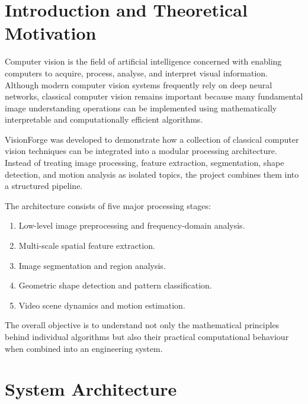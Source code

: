 \documentclass[11pt,a4paper]{article}
\begin{document}

\section{Introduction and Theoretical Motivation}

Computer vision is the field of artificial intelligence concerned with enabling computers to acquire, process, analyse, and interpret visual information. Although modern computer vision systems frequently rely on deep neural networks, classical computer vision remains important because many fundamental image understanding operations can be implemented using mathematically interpretable and computationally efficient algorithms.

VisionForge was developed to demonstrate how a collection of classical computer vision techniques can be integrated into a modular processing architecture. Instead of treating image processing, feature extraction, segmentation, shape detection, and motion analysis as isolated topics, the project combines them into a structured pipeline.

The architecture consists of five major processing stages:

\begin{enumerate}
    \item Low-level image preprocessing and frequency-domain analysis.
    \item Multi-scale spatial feature extraction.
    \item Image segmentation and region analysis.
    \item Geometric shape detection and pattern classification.
    \item Video scene dynamics and motion estimation.
\end{enumerate}

The overall objective is to understand not only the mathematical principles behind individual algorithms but also their practical computational behaviour when combined into an engineering system.


\section{System Architecture}
\end{document}
